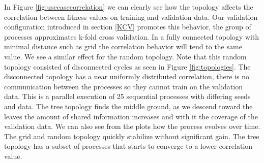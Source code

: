 In Figure \ref{fig:usecasecorrelation} we can clearly see how the topology affects the correlation between fitness values on training and validation data. Our validation configuration introduced in section \ref{KCV} promotes this behavior, the group of processes approximates k-fold cross validation. In a fully connected topology with minimal distance such as grid the correlation behavior will tend to the same value. We see a similar effect for the random topology. Note that this random topology consisted of disconnected cycles as seen in Figure \ref{fig:topologies}. The disconnected topology has  a near uniformly distributed correlation, there is no communication between the processes so they cannot train on the validation data. This is a parallel execution of 25 sequential processes with differing seeds and data. The tree topology finds the middle ground, as we descend toward the leaves the amount of shared information increases and with it the coverage of the validation data.
We can also see from the plots how the process evolves over time. The grid and random topology quickly stabilize without significant gain. The tree topology has a subset of processes that starts to converge to a lower correlation value. 

